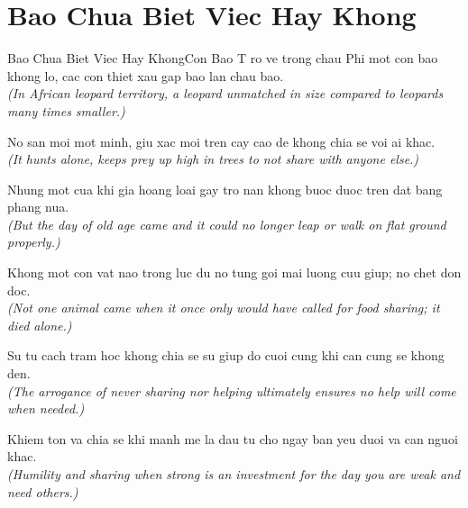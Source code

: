 \section{Bao Chua Biet Viec Hay Khong}
\begin{truyen}{Bao Chua Biet Viec Hay Khong}{Con Bao}
T ro ve trong chau Phi mot con bao khong lo, cac con thiet xau gap bao lan chau bao.\\
\textit{(In African leopard territory, a leopard unmatched in size compared to leopards many times smaller.)}

No san moi mot minh, giu xac moi tren cay cao de khong chia se voi ai khac.\\
\textit{(It hunts alone, keeps prey up high in trees to not share with anyone else.)}

Nhung mot cua khi gia hoang loai gay tro nan khong buoc duoc tren dat bang phang nua.\\
\textit{(But the day of old age came and it could no longer leap or walk on flat ground properly.)}

Khong mot con vat nao trong luc du no tung goi mai luong cuu giup; no chet don doc.\\
\textit{(Not one animal came when it once only would have called for food sharing; it died alone.)}

Su tu cach tram hoc khong chia se su giup do cuoi cung khi can cung se khong den.\\
\textit{(The arrogance of never sharing nor helping ultimately ensures no help will come when needed.)}

\end{truyen}
\begin{baihoc}
  Khiem ton va chia se khi manh me la dau tu cho ngay ban yeu duoi va can nguoi khac.\\
  \textit{(Humility and sharing when strong is an investment for the day you are weak and need others.)}
\end{baihoc}

